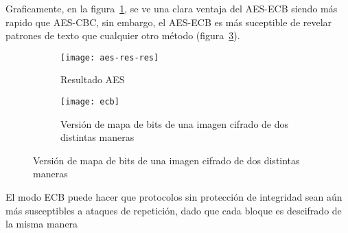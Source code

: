 \documentclass[../main.tex]{subfiles}
\begin{document}
Graficamente, en la figura~\ref{fig:aes}, se ve una clara ventaja del AES-ECB siendo más rapido que AES-CBC, sin embargo, el
AES-ECB es más suceptible de revelar patrones de texto que cualquier otro método (figura~\ref{fig:ejem}).
\begin{figure}[H]
\begin{subfigure}[b]{0.6\textwidth}
  \centering
  \texttt{[image: aes-res-res]}
  \caption{Resultado AES}\label{fig:aes}
\end{subfigure}
\hfill{}
\begin{subfigure}[b]{0.4\textwidth}
  \centering
  \texttt{[image: ecb]}
  \caption{Versión de mapa de bits de una imagen cifrado de dos distintas maneras}\label{fig:ejem}
\end{subfigure}
\end{figure}
El modo ECB puede hacer que protocolos sin protección de integridad sean aún más susceptibles a ataques de repetición, dado que cada bloque es descifrado de la misma manera
\end{document}
